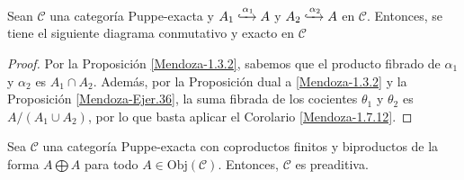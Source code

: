 \documentclass[tesis]{subfiles}
\begin{document}
\begin{Coro}\label{Mendoza-1.7.13'}
    Sean $\mathscr{C}$ una categoría Puppe-exacta y $A_1\xhookrightarrow{\alpha_1}A$ y $A_2\xhookrightarrow{\alpha_2}A$ en $\mathscr{C}$. Entonces, se tiene el siguiente diagrama conmutativo y exacto en $\mathscr{C}$
    \begin{center}
    \end{center}
\end{Coro}

\begin{proof}
    Por la Proposición \ref{Mendoza-1.3.2}, sabemos que el producto fibrado de $\alpha_1$ y $\alpha_2$ es $A_1\cap A_2$. Además, por la Proposición dual a \ref{Mendoza-1.3.2} y la Proposición \ref{Mendoza-Ejer.36}, la suma fibrada de los cocientes $\theta_1$ y $\theta_2$ es $A/(A_1\cup A_2)$, por lo que basta aplicar el Corolario \ref{Mendoza-1.7.12}.
\end{proof}

\begin{Prop}\label{Mendoza-1.9.13}
    Sea $\mathscr{C}$ una categoría Puppe-exacta con coproductos finitos y biproductos de la forma $A\bigoplus A$ para todo $A\in\text{Obj}(\mathscr{C})$. Entonces, $\mathscr{C}$ es preaditiva.
\end{Prop}
\end{document}
